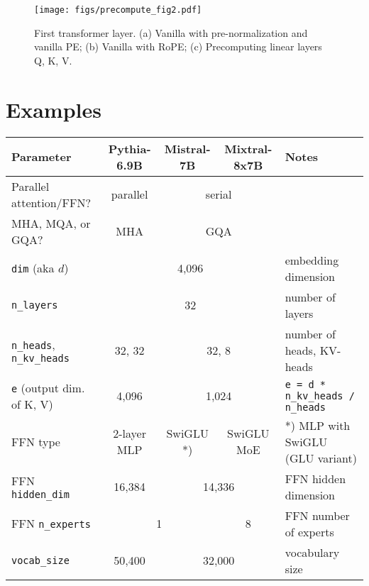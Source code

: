 \documentclass{article}
\begin{document}
\begin{figure} \centering
  \texttt{[image: figs/precompute\_fig2.pdf]}
  \caption{First transformer layer. (a) Vanilla with pre-normalization and vanilla PE; (b) Vanilla with RoPE; (c) Precomputing linear layers Q, K, V.}
 \label{fig2} \end{figure}

\section{Examples} \label{sec:examples}

\begingroup
\renewcommand{\arraystretch}{1.3} %
\begin{center} \begin{tabular}{|l|c|c|c|l|} \hline
  \textbf{Parameter} & \textbf{Pythia-6.9B} & \textbf{Mistral-7B} & \textbf{Mixtral-8x7B} & \textbf{Notes} \\ \hline
  Parallel attention/FFN? & parallel         & \multicolumn{2}{c|}{serial} & \citep{parallel}              \\ \hline
  MHA, MQA, or GQA?       & MHA              & \multicolumn{2}{c|}{GQA}    & \citep{vanilla, MQA, GQA}     \\ \hline
  \verb+dim+ (aka $d$)    & \multicolumn{3}{c|}{4,096}                     & embedding dimension           \\ \hline
  \verb+n_layers+         & \multicolumn{3}{c|}{32}                        & number of layers              \\ \hline
  \verb+n_heads+, \verb+n_kv_heads+ & 32, 32 & \multicolumn{2}{c|}{32, 8}  & number of heads, KV-heads     \\ \hline
  \verb+e+ (output dim. of K, V) & 4,096     & \multicolumn{2}{c|}{1,024}  & \verb+e = d * n_kv_heads / n_heads+ \\ \hline
  FFN type                & 2-layer MLP      & SwiGLU *) & SwiGLU MoE      & *) MLP with SwiGLU (GLU variant) \citep{GLU, MoE} \\ \hline
  FFN \verb+hidden_dim+   & 16,384           & \multicolumn{2}{c|}{14,336} & FFN hidden dimension          \\ \hline
  FFN \verb+n_experts+    & \multicolumn{2}{c|}{1}  & 8                    & FFN number of experts         \\ \hline
  \verb+vocab_size+       & 50,400           & \multicolumn{2}{c|}{32,000} & vocabulary size               \\ \hline


\end{tabular}
\end{center}
\end{document}
